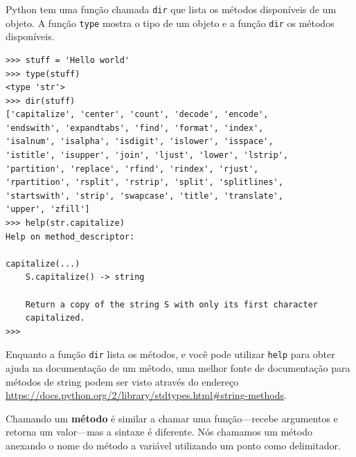 {%

Python tem uma função chamada {\tt dir} que lista os métodos disponíveis de
um objeto. A função {\tt type} mostra o tipo de um objeto e a função {\tt dir}
os métodos disponíveis.

\beforeverb
\begin{verbatim}
>>> stuff = 'Hello world'
>>> type(stuff)
<type 'str'>
>>> dir(stuff)
['capitalize', 'center', 'count', 'decode', 'encode',
'endswith', 'expandtabs', 'find', 'format', 'index',
'isalnum', 'isalpha', 'isdigit', 'islower', 'isspace',
'istitle', 'isupper', 'join', 'ljust', 'lower', 'lstrip',
'partition', 'replace', 'rfind', 'rindex', 'rjust',
'rpartition', 'rsplit', 'rstrip', 'split', 'splitlines',
'startswith', 'strip', 'swapcase', 'title', 'translate',
'upper', 'zfill']
>>> help(str.capitalize)
Help on method_descriptor:

capitalize(...)
    S.capitalize() -> string

    Return a copy of the string S with only its first character
    capitalized.
>>>
\end{verbatim}
\afterverb
%


Enquanto a função {\tt dir} lista os métodos, e você pode utilizar {\tt help}
para obter ajuda na documentação de um método, uma melhor fonte de
documentação para métodos de string podem ser visto através do endereço
\url{https://docs.python.org/2/library/stdtypes.html#string-methods}.


Chamando um {\bf método} é similar a chamar uma função---recebe argumentos e
retorna um valor---mas a sintaxe é diferente. Nós chamamos um método anexando
o nome do método a variável utilizando um ponto como delimitador.


}
